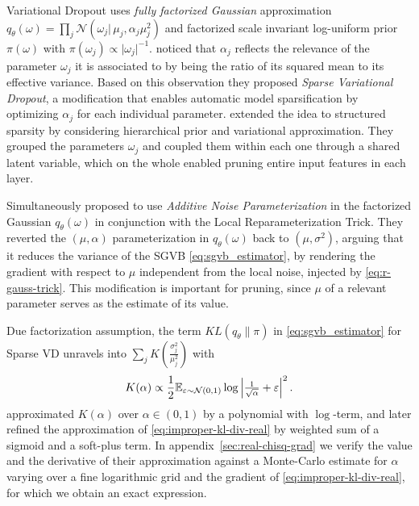\documentclass[a4paper,10pt,twocolumn]{article}
\begin{document}
Variational Dropout uses \emph{fully factorized Gaussian} approximation $
  q_\theta(\omega)
    = \prod_j \mathcal{N}(\omega_j \vert\, \mu_j, \alpha_j \mu_j^2)
$ and factorized scale invariant log-uniform prior $\pi(\omega)$ with $
  \pi(\omega_j) \propto \lvert \omega_j \rvert^{-1}
$. \citet{molchanov_variational_2017} noticed that $\alpha_j$ reflects the relevance of the
parameter $\omega_j$ it is associated to by being the ratio of its squared mean to its
effective variance. Based on this observation they proposed \emph{Sparse Variational Dropout},
a modification that enables automatic model sparsification by optimizing $\alpha_j$ for each
individual parameter. \citet{louizos_bayesian_2017} extended the idea to structured sparsity
by considering hierarchical prior and variational approximation. They grouped the parameters
$\omega_j$ and coupled them within each one through a shared latent variable, which on the
whole enabled pruning entire input features in each layer.
%

Simultaneously \citet{molchanov_variational_2017} proposed to use \emph{Additive Noise
Parameterization} in the factorized Gaussian $q_\theta(\omega)$ in conjunction with the
Local Reparameterization Trick. They reverted the $(\mu, \alpha)$ parameterization in
$q_\theta(\omega)$ back to $(\mu, \sigma^2)$, arguing that it reduces the variance of the
SGVB \eqref{eq:sgvb_estimator}, by rendering the gradient with respect to $\mu$ independent
from the local noise, injected by \eqref{eq:r-gauss-trick}. This modification is important
for pruning, since $\mu$ of a relevant parameter serves as the estimate of its value.

Due factorization assumption, the term $KL(q_\theta \| \pi)$ in \eqref{eq:sgvb_estimator}
for Sparse VD unravels into $
  \sum_j K(\tfrac{\sigma^2_{j}}{\mu_{j}^2})
$ with
\begin{equation}  \label{eq:improper-kl-div-real}
  K(\alpha)
    \propto \frac12 \mathbb{E}_{\varepsilon \sim \mathcal{N}(0, 1)}
        \log{\Bigl\lvert \tfrac1{\sqrt{\alpha}} + \varepsilon \Bigr\rvert^2}
  \,.
\end{equation}
\citet{kingma_variational_2015} approximated $K(\alpha)$ over $\alpha \in (0, 1)$ by
a polynomial with $\log$-term, and later \citet{molchanov_variational_2017} refined the
approximation of \eqref{eq:improper-kl-div-real} by weighted sum of a sigmoid and a
soft-plus term.
In appendix~\ref{sec:real-chisq-grad} we verify the value and the derivative of their
approximation against a Monte-Carlo estimate for
$\alpha$ varying over a fine logarithmic grid and the gradient of \eqref{eq:improper-kl-div-real},
for which we obtain an exact expression.
\end{document}
